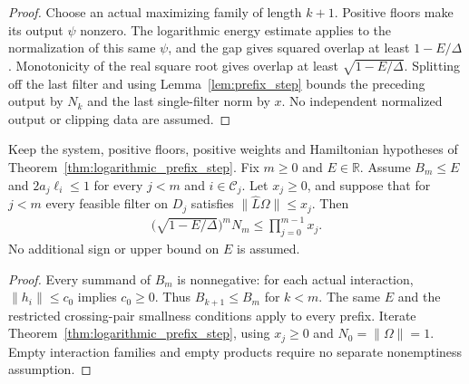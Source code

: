 \begin{proof}
    \leanok
    Choose an actual maximizing family of length $k+1$. Positive
    floors make its output $\psi$ nonzero. The logarithmic energy
    estimate applies to the normalization of this same $\psi$,
    and the gap gives squared overlap at least $1-E/\Delta$.
    Monotonicity of the real square root gives overlap at least
    $\sqrt{1-E/\Delta}$. Splitting off the last filter and using
    Lemma~\ref{lem:prefix_step} bounds the preceding output by
    $N_k$ and the last single-filter norm by $x$. No independent
    normalized output or clipping data are assumed.
\end{proof}

\begin{theorem}
    \label{thm:logarithmic_prefix_product}
    \leanok
    Keep the system, positive floors, positive weights and
    Hamiltonian hypotheses of
    Theorem~\ref{thm:logarithmic_prefix_step}. Fix $m\ge0$ and
    $E\in\mathbb R$. Assume $B_m\le E$ and $2a_j\ell_i\le1$
    for every $j<m$ and $i\in\mathcal C_j$. Let $x_j\ge0$,
    and suppose that for $j<m$ every feasible filter on $D_j$
    satisfies $\lVert\widehat L\Omega\rVert\le x_j$. Then
    \begin{align*}
        \bigl(\sqrt{1-E/\Delta}\bigr)^mN_m
        \le\prod_{j=0}^{m-1}x_j.
    \end{align*}
    No additional sign or upper bound on $E$ is assumed.
\end{theorem}
\begin{proof}
    \leanok
    Every summand of $B_m$ is nonnegative: for each actual
    interaction, $\lVert h_i\rVert\le c_0$ implies $c_0\ge0$.
    Thus $B_{k+1}\le B_m$ for $k<m$. The same $E$ and the
    restricted crossing-pair smallness conditions apply to every
    prefix. Iterate Theorem~\ref{thm:logarithmic_prefix_step},
    using $x_j\ge0$ and $N_0=\lVert\Omega\rVert=1$.
    Empty interaction families and empty products require no
    separate nonemptiness assumption.
\end{proof}

